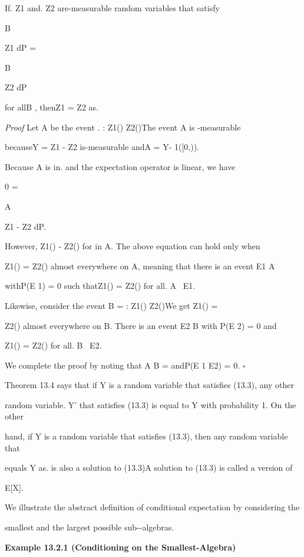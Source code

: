 If. Z1 and. Z2 are-measurable random variables that satisfy

\int

B

Z1 dP =

\int

B

Z2 dP

for allB \in{}, thenZ1 = Z2 as.

\textit{Proof} Let A be the event .{ : Z1() \geq Z2()}The event A is -measurable

becauseY = Z1 - Z2 is-measurable andA = Y- 1([0,\infty )).

Because A is in. and the expectation operator is linear, we have

0 =

\int

A

Z1 - Z2 dP.

However, Z1() - Z2()  for in A. The above equation can hold only when

Z1() = Z2() almost everywhere on A, meaning that there is an event E1 \subset A

withP(E 1) = 0 such thatZ1() = Z2() for all. \in A \ E1.

Likewise, consider the event B ={ : Z1() \leq Z2()}We get Z1() =

Z2() almost everywhere on B. There is an event E2 \subset B with P(E 2) = 0 and

Z1() = Z2() for all. \in B \ E2.

We complete the proof by noting that A \cup B = \Omega andP(E 1 \cup E2) = 0. \hfill $\square$

Theorem 13.4 says that if Y is a random variable that satisfies (13.3), any other

random variable. Y' that satisfies (13.3) is equal to Y with probability 1. On the other

hand, if Y is a random variable that satisfies (13.3), then any random variable that

equals Y as. is also a solution to (13.3)A solution to (13.3) is called a version of

E[X\vert{}].

We illustrate the abstract definition of conditional expectation by considering the

smallest and the largest possible sub-\sigma-algebras.

\textbf{Example 13.2.1 (Conditioning on the Smallest\sigma-Algebra)} \\

